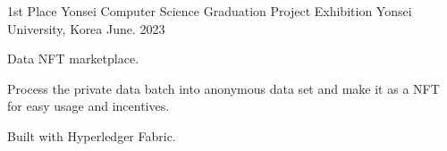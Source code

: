 


\begin{cventries}
    


\cventry
{1st Place} %
{Yonsei Computer Science Graduation Project Exhibition} %
{Yonsei University, Korea} %
{June. 2023} %
{
\begin{cvitems}
\item {Data NFT marketplace.}
\item {Process the private data batch into anonymous data set and make it as a NFT for easy usage and incentives.}
\item {Built with Hyperledger Fabric.}
\end{cvitems}
}


\end{cventries}